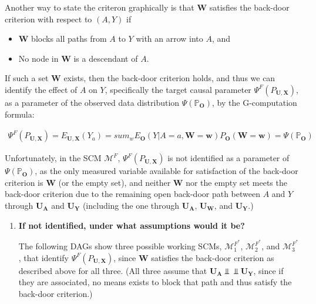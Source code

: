 \documentclass{article}\usepackage[]{graphicx}\usepackage[]{xcolor}
\begin{document}
\begin{enumerate}[label=\textbf{\arabic*.}]
Another way to state the criteron graphically is that $\bm{W}$ satisfies the back-door criterion with respect to $(A,Y)$ if
  
  \begin{itemize}
    \item $\bm{W}$ blocks all paths from $A$ to $Y$ with an arrow into $A$, and
    \item No node in $\bm{W}$ is a descendant of $A$.
  \end{itemize}
  
If such a set $\bm{W}$ exists, then the back-door criterion holds, and thus we can identify the effect of $A$ on $Y$, specifically the target causal parameter $\Psi^F(P_{\bm{U},\bm{X}})$, as a parameter of the observed data distribution $\Psi(\mathbb{P}_{\bm{O}})$, by the G-computation formula:

\begin{align*}
\Psi^F(P_{\bm{U},\bm{X}}) = E_{\bm{U},\bm{X}}(Y_a)=sum_{w}E_{\bm{O}}(Y|A=a,\bm{W}=\bm{w})P_{\bm{O}}(\bm{W}=\bm{w})=\Psi(\mathbb{P}_{\bm{O}})
\end{align*}
  
Unfortunately, in the SCM $\mathcal{M}^{F}$, $\Psi^F(P_{\bm{U},\bm{X}})$ is not identified as a parameter of $\Psi(\mathbb{P}_{\bm{O}})$, as the only measured variable available for satisfaction of the back-door criterion is $\bm{W}$ (or the empty set), and neither $\bm{W}$ nor the empty set meets the back-door criterion due to the remaining open back-door path between $A$ and $Y$ through $\bm{U_A}$ and $\bm{U_Y}$ (including the one through $\bm{U_A}$, $\bm{U_W}$, and $\bm{U_Y}$.)
  
  \begin{enumerate}[label=\textbf{(\alph*)}]
  
    \item \textbf{If not identified, under what assumptions would it be?}
    
The following DAGs show three possible working SCMs, $\mathcal{M}^{F^*}_1$, $\mathcal{M}^{F^*}_2$, and $\mathcal{M}^{F^*}_3$, that identify $\Psi^F(P_{\bm{U},\bm{X}})$, since $\bm{W}$ satisfies the back-door criterion as described above for all three. (All three assume that $\bm{U_A} \Perp \!\!\!\! \Perp \bm{U_Y}$, since if they are associated, no means exists to block that path and thus satisfy the back-door criterion.)
    
\pagebreak
    
\begin{itemize}


\end{itemize}
\end{enumerate}
\end{enumerate}
\end{document}
